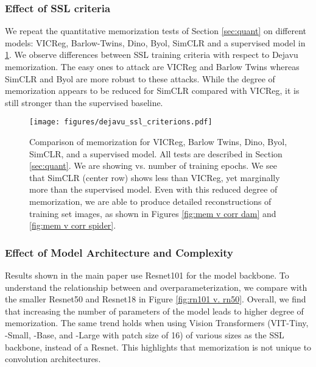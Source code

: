 \subsubsection{Effect of SSL criteria}
\label{sec:appx simclr results} 
We repeat the quantitative memorization tests of Section \ref{sec:quant} on different models: VICReg\citep{vicreg}, Barlow-Twins\citep{zbontar2021barlow}, Dino\citep{Dino}, Byol\citep{grill2020byol}, SimCLR\citep{simclr} and a supervised model in \cref{fig:all_models_quantitative}. We observe differences between SSL training criteria with respect to Dejavu memorization. The easy ones to attack are VICReg and Barlow Twins whereas SimCLR and Byol are more robust to these attacks. While the degree of memorization appears to be reduced for SimCLR compared with VICReg, it is still stronger than the supervised baseline.

\begin{figure}[ht]
\captionsetup[subfigure]{font=scriptsize,labelfont=scriptsize}
     \centering
     \texttt{[image: figures/dejavu\_ssl\_criterions.pdf]}
\caption{
Comparison of \dejavu memorization for VICReg, Barlow Twins, Dino, Byol, SimCLR, and a supervised model. All tests are described in Section \ref{sec:quant}. We are showing \dejavu vs. number of training epochs. We see that SimCLR (center row) shows less \dejavu than VICReg, yet marginally more than the supervised model. Even with this reduced degree of memorization, we are able to produce detailed reconstructions of training set images, as shown in Figures \ref{fig:mem v corr dam} and \ref{fig:mem v corr spider}. 
}
\label{fig:all_models_quantitative}
\end{figure}

\clearpage 

\subsubsection{Effect of Model Architecture and Complexity}
\label{sec:appx rn50}
Results shown in the main paper use Resnet101 for the model backbone. To understand the relationship between \dejavu and overparameterization, we compare with the smaller Resnet50 and Resnet18 in Figure \ref{fig:rn101 v. rn50}. Overall, we find that increasing the number of parameters of the model leads to higher degree of \dejavu memorization. The same trend holds when using Vision Transformers (VIT-Tiny, -Small, -Base, and -Large with patch size of 16) of various sizes as the SSL backbone, instead of a Resnet. This highlights that \dejavu memorization is not unique to convolution architectures. 

